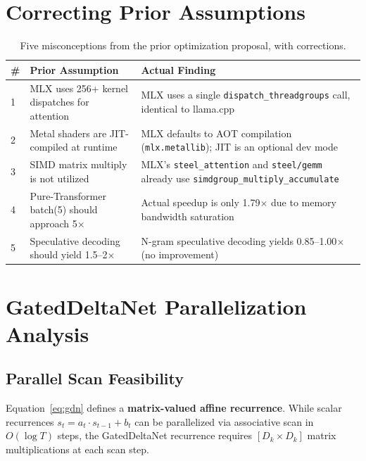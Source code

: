 \documentclass[11pt,a4paper]{article}
\begin{document}
\section{Correcting Prior Assumptions}

\begin{table}[H]
\centering
\caption{Five misconceptions from the prior optimization proposal, with corrections.}
\label{tab:corrections}
\begin{tabularx}{\textwidth}{lXX}
\toprule
\textbf{\#} & \textbf{Prior Assumption} & \textbf{Actual Finding} \\
\midrule
1 & MLX uses 256+ kernel dispatches for attention & MLX uses a single \texttt{dispatch\_threadgroups} call, identical to llama.cpp \\
2 & Metal shaders are JIT-compiled at runtime & MLX defaults to AOT compilation (\texttt{mlx.metallib}); JIT is an optional dev mode \\
3 & SIMD matrix multiply is not utilized & MLX's \texttt{steel\_attention} and \texttt{steel/gemm} already use \texttt{simdgroup\_multiply\_accumulate} \\
4 & Pure-Transformer batch(5) should approach 5$\times$ & Actual speedup is only 1.79$\times$ due to memory bandwidth saturation \\
5 & Speculative decoding should yield 1.5--2$\times$ & N-gram speculative decoding yields 0.85--1.00$\times$ (no improvement) \\
\bottomrule
\end{tabularx}
\end{table}

\section{GatedDeltaNet Parallelization Analysis}

\subsection{Parallel Scan Feasibility}

Equation~\ref{eq:gdn} defines a \textbf{matrix-valued affine recurrence}. While scalar recurrences $s_t = a_t \cdot s_{t-1} + b_t$ can be parallelized via associative scan in $O(\log T)$ steps, the GatedDeltaNet recurrence requires $[D_k \times D_k]$ matrix multiplications at each scan step.
\end{document}
